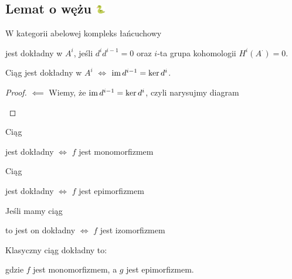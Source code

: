 \subsection{Lemat o wężu \includegraphics[width=4mm]{wunsz.png}}

\begin{definition}
  W kategorii abelowej kompleks łańcuchowy
  \begin{center}\end{center}
  jest dokładny w $A^i$, jeśli $d^id^{i-1}=0$ oraz $i$-ta grupa kohomologii $H^i(A^\cdot)=0$.

\end{definition}

\begin{lemma}
  Ciąg jest dokładny w $A^i$ $\iff$ $\operatorname{im} d^{i-1}=\ker d^i$.
\end{lemma}

\begin{proof}
  $\impliedby$ 
  Wiemy, że $\operatorname{im} d^{i-1}=\ker d^i$, czyli narysujmy diagram
  \begin{center}\end{center}
\end{proof}

\begin{example}
  \item Ciąg  jest dokładny $\iff$ $f$ jest monomorfizmem 
  \item Ciąg  jest dokładny $\iff$ $f$ jest epimorfizmem 
  \item Jeśli mamy ciąg  to jest on dokładny $\iff$ $f$ jest izomorfizmem
  \item Klasyczny ciąg dokładny to:
    \begin{center}\end{center}
    gdzie $f$ jest monomorfizmem, a $g$ jest epimorfizmem.
\end{example}

